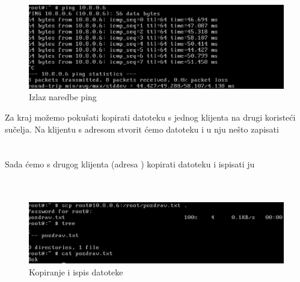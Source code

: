         \noindent
         \\
         \\
        \begin{figure}[H]
            \centering
            \includegraphics[scale=0.5]{slike/pingResult}
            \caption{Izlaz naredbe ping}
        \end{figure}

        Za kraj možemo pokušati kopirati datoteku s jednog klijenta na drugi
        koristeći  sučelja. Na klijentu s adresom 
        stvorit ćemo datoteku  i u nju nešto zapisati \\ 

        \noindent
         \\
         \\

        \noindent
        Sada ćemo s drugog klijenta (adresa ) kopirati
         datoteku i ispisati ju \\
         \\
        \\

        \begin{figure}[H]
            \centering
            \includegraphics[scale=0.45]{slike/pozdrav}
            \caption{Kopiranje i ispis datoteke }
        \end{figure}
